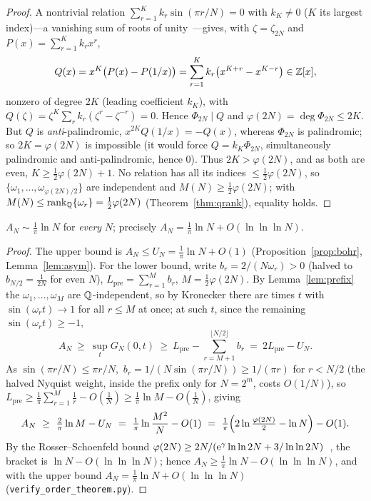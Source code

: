 \begin{proof}
A nontrivial relation $\sum_{r=1}^K k_r\sin(\pi r/N)=0$ with $k_K\ne0$ ($K$ its largest index)---a
vanishing sum of roots of unity~\cite{CJ}---gives, with $\zeta=\zeta_{2N}$ and $P(x)=\sum_{r=1}^K k_r x^r$,
\[
  Q(x)=x^K\bigl(P(x)-P(1/x)\bigr)=\sum_{r=1}^K k_r\bigl(x^{K+r}-x^{K-r}\bigr)\in\mathbb{Z}[x],
\]
nonzero of degree $2K$ (leading coefficient $k_K$), with $Q(\zeta)=\zeta^K\sum_r k_r(\zeta^r-\zeta^{-r})=0$.
Hence $\Phi_{2N}\mid Q$ and $\varphi(2N)=\deg\Phi_{2N}\le2K$. But $Q$ is \emph{anti}-palindromic,
$x^{2K}Q(1/x)=-Q(x)$, whereas $\Phi_{2N}$ is palindromic; so $2K=\varphi(2N)$ is impossible (it would force
$Q=k_K\Phi_{2N}$, simultaneously palindromic and anti-palindromic, hence $0$). Thus $2K>\varphi(2N)$, and as
both are even, $K\ge\tfrac12\varphi(2N)+1$. No relation has all its indices $\le\tfrac12\varphi(2N)$, so
$\{\omega_1,\dots,\omega_{\varphi(2N)/2}\}$ are independent and $M(N)\ge\tfrac12\varphi(2N)$; with
$M(N)\le\operatorname{rank}_{\mathbb{Q}}\{\omega_r\}=\tfrac12\varphi(2N)$ (Theorem~\ref{thm:qrank}), equality holds. \end{proof}

\begin{theorem}[order]\label{thm:order}
$A_N\sim\tfrac1\pi\ln N$ for \emph{every} $N$; precisely $A_N=\tfrac1\pi\ln N+O(\ln\ln\ln N)$.
\end{theorem}

\begin{proof}
The upper bound is $A_N\le U_N=\tfrac1\pi\ln N+O(1)$ (Proposition~\ref{prop:bohr}, Lemma~\ref{lem:asym}). For
the lower bound, write $b_r=2/(N\omega_r)>0$ (halved to $b_{N/2}=\tfrac1{2N}$ for even $N$),
$L_{\mathrm{pre}}=\sum_{r=1}^M b_r$, $M=\tfrac12\varphi(2N)$.
By Lemma~\ref{lem:prefix} the $\omega_1,\dots,\omega_M$ are $\mathbb{Q}$-independent, so by Kronecker there are
times $t$ with $\sin(\omega_r t)\to1$ for all $r\le M$ at once; at such $t$, since the remaining
$\sin(\omega_r t)\ge-1$,
\[
  A_N\ \ge\ \sup_t G_N(0,t)\ \ge\ L_{\mathrm{pre}}-\!\!\sum_{r=M+1}^{\lfloor N/2\rfloor}\!\!b_r\ =\ 2L_{\mathrm{pre}}-U_N .
\]
As $\sin(\pi r/N)\le\pi r/N$, $\,b_r=1/(N\sin(\pi r/N))\ge1/(\pi r)$ for $r<N/2$ (the halved Nyquist weight,
inside the prefix only for $N=2^m$, costs $O(1/N)$), so
$L_{\mathrm{pre}}\ge\tfrac1\pi\sum_{r=1}^M\tfrac1r-O(\tfrac1N)\ge\tfrac1\pi\ln M-O(\tfrac1N)$, giving
\[
  A_N\ \ge\ \tfrac2\pi\ln M-U_N\ =\ \tfrac1\pi\ln\frac{M^2}{N}-O(1)
        \ =\ \tfrac1\pi\Bigl(2\ln\tfrac{\varphi(2N)}2-\ln N\Bigr)-O(1).
\]
By the Rosser--Schoenfeld bound $\varphi(2N)\ge 2N/\!\left(\mathrm{e}^{\gamma}\ln\ln 2N+3/\ln\ln 2N\right)$~\cite{RS62},
the bracket is $\ln N-O(\ln\ln\ln N)$; hence $A_N\ge\tfrac1\pi\ln N-O(\ln\ln\ln N)$, and with the upper
bound $A_N=\tfrac1\pi\ln N+O(\ln\ln\ln N)$ (\texttt{verify\_order\_theorem.py}). \end{proof}

